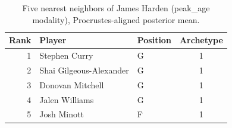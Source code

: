 \begin{table}[htbp]
  \centering\small
  \begin{tabular}{rllc}
    \toprule
    Rank & Player & Position & Archetype \\
    \midrule
    1 & Stephen Curry & G & 1 \\
    2 & Shai Gilgeous-Alexander & G & 1 \\
    3 & Donovan Mitchell & G & 1 \\
    4 & Jalen Williams & G & 1 \\
    5 & Josh Minott & F & 1 \\
    \bottomrule
  \end{tabular}
  \caption{Five nearest neighbors of James Harden (peak_age modality), Procrustes-aligned posterior mean.}
  \label{tab:James_Harden_neighbors_peak_age}
\end{table}

